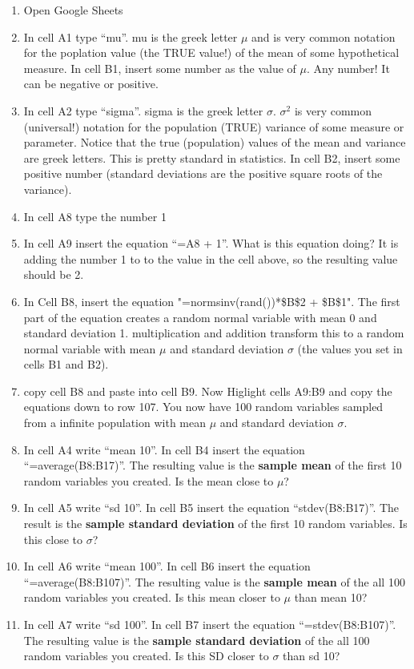 \documentclass[]{book}
\providecommand{\tightlist}{%
  \setlength{\itemsep}{0pt}\setlength{\parskip}{0pt}}
\begin{document}
\begin{enumerate}
\def\labelenumi{\arabic{enumi}.}
\tightlist
\item
  Open Google Sheets
\item
  In cell A1 type ``mu''. mu is the greek letter \(\mu\) and is very common notation for the poplation value (the TRUE value!) of the mean of some hypothetical measure. In cell B1, insert some number as the value of \(\mu\). Any number! It can be negative or positive.
\item
  In cell A2 type ``sigma''. sigma is the greek letter \(\sigma\). \(\sigma^2\) is very common (universal!) notation for the population (TRUE) variance of some measure or parameter. Notice that the true (population) values of the mean and variance are greek letters. This is pretty standard in statistics. In cell B2, insert some positive number (standard deviations are the positive square roots of the variance).
\item
  In cell A8 type the number 1
\item
  In cell A9 insert the equation ``=A8 + 1''. What is this equation doing? It is adding the number 1 to to the value in the cell above, so the resulting value should be 2.
\item
  In Cell B8, insert the equation "=normsinv(rand())*\$B\$2 + \$B\$1". The first part of the equation creates a random normal variable with mean 0 and standard deviation 1. multiplication and addition transform this to a random normal variable with mean \(\mu\) and standard deviation \(\sigma\) (the values you set in cells B1 and B2).
\item
  copy cell B8 and paste into cell B9. Now Higlight cells A9:B9 and copy the equations down to row 107. You now have 100 random variables sampled from a infinite population with mean \(\mu\) and standard deviation \(\sigma\).
\item
  In cell A4 write ``mean 10''. In cell B4 insert the equation ``=average(B8:B17)''. The resulting value is the \textbf{sample mean} of the first 10 random variables you created. Is the mean close to \(\mu\)?
\item
  In cell A5 write ``sd 10''. In cell B5 insert the equation ``stdev(B8:B17)''. The result is the \textbf{sample standard deviation} of the first 10 random variables. Is this close to \(\sigma\)?
\item
  In cell A6 write ``mean 100''. In cell B6 insert the equation ``=average(B8:B107)''. The resulting value is the \textbf{sample mean} of the all 100 random variables you created. Is this mean closer to \(\mu\) than mean 10?
\item
  In cell A7 write ``sd 100''. In cell B7 insert the equation ``=stdev(B8:B107)''. The resulting value is the \textbf{sample standard deviation} of the all 100 random variables you created. Is this SD closer to \(\sigma\) than sd 10?
\end{enumerate}
\end{document}
